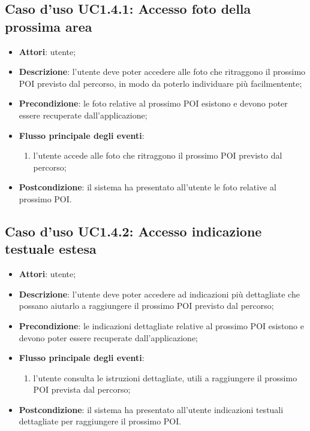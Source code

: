 \documentclass[../AnalisiDeiRequisiti.tex]{subfiles}
\begin{document}
\subsection{Caso d'uso UC1.4.1: Accesso foto della prossima area}
\begin{itemize}
\item \textbf{Attori}: utente;
\item \textbf{Descrizione}: l'utente deve poter accedere alle foto che ritraggono il prossimo POI previsto dal percorso, in modo da poterlo individuare più facilmentente; 
      \item \textbf{Precondizione}: le foto relative al prossimo POI esistono e devono poter essere recuperate dall'applicazione;

        \item \textbf{Flusso principale degli eventi}:
          \begin{enumerate}
          \item l'utente accede alle foto che ritraggono il prossimo POI previsto dal percorso;

      \end{enumerate}
    \item \textbf{Postcondizione}: il sistema ha presentato all'utente le foto relative al prossimo POI.
  \end{itemize}
\hypertarget{UC1.4.2}{}
\subsection{Caso d'uso UC1.4.2: Accesso indicazione testuale estesa}
\begin{itemize}
\item \textbf{Attori}: utente;
\item \textbf{Descrizione}: l'utente deve poter accedere ad indicazioni più dettagliate che possano aiutarlo a raggiungere il prossimo POI previsto dal percorso; 
      \item \textbf{Precondizione}: le indicazioni dettagliate relative al prossimo POI esistono e devono poter essere recuperate dall'applicazione;

        \item \textbf{Flusso principale degli eventi}:
          \begin{enumerate}
          \item l'utente consulta le istruzioni dettagliate, utili a raggiungere il prossimo POI prevista dal percorso;

      \end{enumerate}
    \item \textbf{Postcondizione}: il sistema ha presentato all'utente indicazioni testuali dettagliate per raggiungere il prossimo POI.
  \end{itemize}
\hypertarget{UC1.4.3}{}
\end{document}
